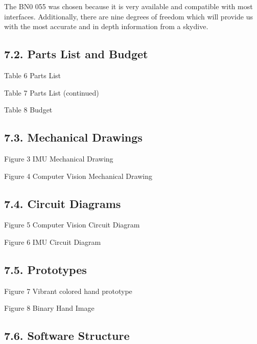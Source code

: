 \documentclass[10pt]{article}
\begin{document}
The BN0 055 was chosen because it is very available and compatible with most interfaces. Additionally, there are nine degrees of freedom which will provide us with the most accurate and in depth information from a skydive.

\subsection{7.2. Parts List and Budget}

Table 6 Parts List

Table 7 Parts List (continued)

Table 8 Budget

\subsection{7.3. Mechanical Drawings}

Figure 3 IMU Mechanical Drawing

Figure 4 Computer Vision Mechanical Drawing

\subsection{7.4. Circuit Diagrams}

Figure 5 Computer Vision Circuit Diagram

Figure 6 IMU Circuit Diagram

\subsection{7.5. Prototypes}

Figure 7 Vibrant colored hand prototype

Figure 8 Binary Hand Image

\subsection{7.6. Software Structure}








\end{document}
